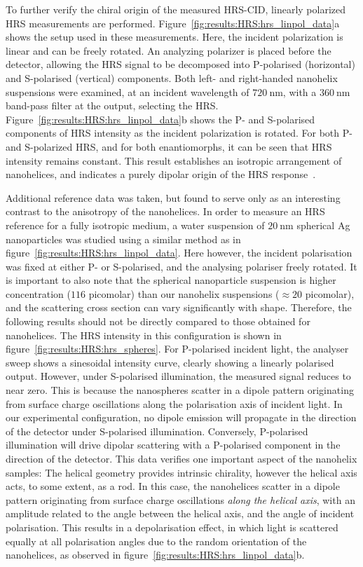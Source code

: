 To further verify the chiral origin of the measured HRS-CID, linearly polarized HRS measurements are performed. Figure~\ref{fig:results:HRS:hrs_linpol_data}a shows the setup used in these measurements. Here, the incident polarization is linear and can be freely rotated. An analyzing polarizer is placed before the detector, allowing the HRS signal to be decomposed into P-polarised (horizontal) and S-polarised (vertical) components. Both left- and right-handed nanohelix suspensions were examined, at an incident wavelength of $\SI{720}{\nano\m}$, with a $\SI{360}{\nano\m}$ band-pass filter at the output, selecting the HRS. 
Figure~\ref{fig:results:HRS:hrs_linpol_data}b shows the P- and S-polarised components of HRS intensity as the incident polarization is rotated. For both P- and S-polarized HRS, and for both enantiomorphs, it can be seen that HRS intensity remains constant. This result establishes an isotropic arrangement of nanohelices, and indicates a purely dipolar origin of the HRS response~\cite{Hao2002b, verbiest2009second}. 

Additional reference data was taken, but found to serve only as an interesting contrast to the anisotropy of the nanohelices. In order to measure an HRS reference for a fully isotropic medium, a water suspension of $\SI{20}{\nano\m}$ spherical Ag nanoparticles was studied using a similar method as in figure~\ref{fig:results:HRS:hrs_linpol_data}. Here however, the incident polarisation was fixed at either P- or S-polarised, and the analysing polariser freely rotated. 
It is important to also note that the spherical nanoparticle suspension is higher concentration ($116$ picomolar) than our nanohelix suspensions ($\approx 20$ picomolar), and the scattering cross section can vary significantly with shape.
Therefore, the following results should not be directly compared to those obtained for nanohelices.
The HRS intensity in this configuration is shown in figure~\ref{fig:results:HRS:hrs_spheres}. 
For P-polarised incident light, the analyser sweep shows a sinesoidal intensity curve, clearly showing a linearly polarised output. However, under S-polarised illumination, the measured signal reduces to near zero. This is because the nanospheres scatter in a dipole pattern originating from surface charge oscillations along the polarisation axis of incident light. 
In our experimental configuration, no dipole emission will propagate in the direction of the detector under S-polarised illumination. Conversely, P-polarised illumination will drive dipolar scattering with a P-polarised component in the direction of the detector. This data verifies one important aspect of the nanohelix samples: The helical geometry provides intrinsic chirality, however the helical axis acts, to some extent, as a rod. In this case, the nanohelices scatter in a dipole pattern originating from surface charge oscillations \textit{along the helical axis}, with an amplitude related to the angle between the helical axis, and the angle of incident polarisation. 
This results in a depolarisation effect, in which light is scattered equally at all polarisation angles due to the random orientation of the nanohelices, as observed in figure~\ref{fig:results:HRS:hrs_linpol_data}b.

